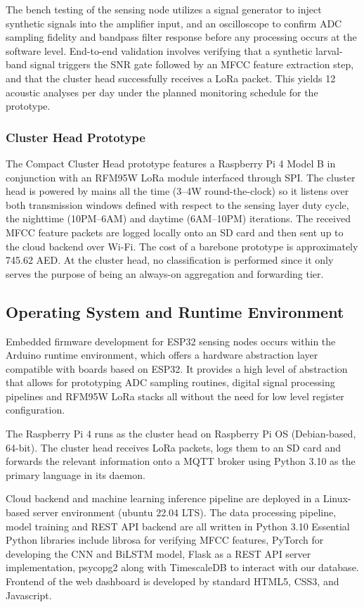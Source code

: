 \documentclass[12pt,a4paper,oneside]{memoir}
\begin{document}
The bench testing of the sensing node utilizes a signal generator to inject synthetic signals into the amplifier input, and an oscilloscope to confirm ADC sampling fidelity and bandpass filter response before any processing occurs at the software level. End-to-end validation involves verifying that a synthetic larval-band signal triggers the SNR gate followed by an MFCC feature extraction step, and that the cluster head successfully receives a LoRa packet. This yields 12 acoustic analyses per day under the planned monitoring schedule for the prototype.

\subsubsection{Cluster Head Prototype}

The Compact Cluster Head prototype features a Raspberry Pi 4 Model B in conjunction with an RFM95W LoRa module interfaced through SPI. The cluster head is powered by mains all the time (3--4W round-the-clock) so it listens over both transmission windows defined with respect to the sensing layer duty cycle, the nighttime (10PM--6AM) and daytime (6AM--10PM) iterations. The received MFCC feature packets are logged locally onto an SD card and then sent up to the cloud backend over Wi-Fi. The cost of a barebone prototype is approximately 745.62 AED. At the cluster head, no classification is performed since it only serves the purpose of being an always-on aggregation and forwarding tier.

\subsection{Operating System and Runtime Environment}
\label{sec:os_runtime}

Embedded firmware development for ESP32 sensing nodes occurs within the Arduino runtime environment, which offers a hardware abstraction layer compatible with boards based on ESP32. It provides a high level of abstraction that allows for prototyping ADC sampling routines, digital signal processing pipelines and RFM95W LoRa stacks all without the need for low level register configuration.

The Raspberry Pi 4 runs as the cluster head on Raspberry Pi OS (Debian-based, 64-bit). The cluster head receives LoRa packets, logs them to an SD card and forwards the relevant information onto a MQTT broker using Python 3.10 as the primary language in its daemon.

Cloud backend and machine learning inference pipeline are deployed in a Linux-based server environment (ubuntu 22.04 LTS). The data processing pipeline, model training and REST API backend are all written in Python 3.10 Essential Python libraries include librosa for verifying MFCC features, PyTorch for developing the CNN and BiLSTM model, Flask as a REST API server implementation, psycopg2 along with TimescaleDB to interact with our database. Frontend of the web dashboard is developed by standard HTML5, CSS3, and Javascript.
\end{document}
